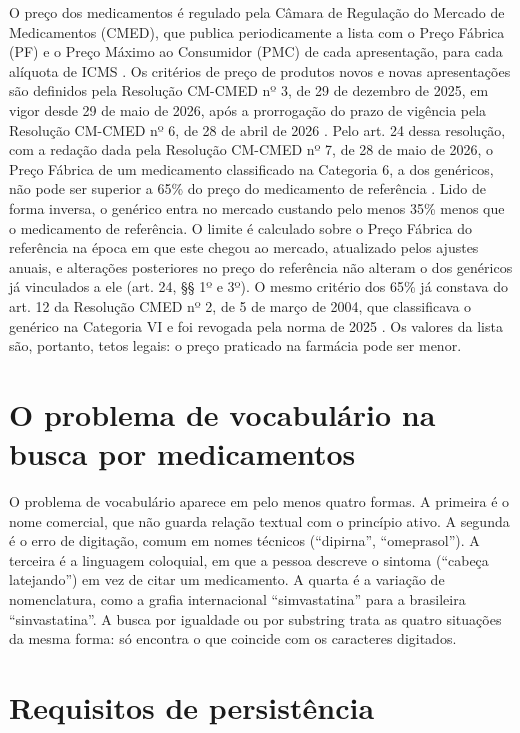 \documentclass[12pt,oneside,a4paper,english,brazil]{abntex2}
\begin{document}
O preço dos medicamentos é regulado pela Câmara de Regulação do Mercado de Medicamentos (CMED), que publica periodicamente a lista com o Preço Fábrica (PF) e o Preço Máximo ao Consumidor (PMC) de cada apresentação, para cada alíquota de ICMS \cite{cmed2026}. Os critérios de preço de produtos novos e novas apresentações são definidos pela Resolução CM-CMED nº 3, de 29 de dezembro de 2025, em vigor desde 29 de maio de 2026, após a prorrogação do prazo de vigência pela Resolução CM-CMED nº 6, de 28 de abril de 2026 \cite{cmedres2025,cmedres2026prazo}. Pelo art. 24 dessa resolução, com a redação dada pela Resolução CM-CMED nº 7, de 28 de maio de 2026, o Preço Fábrica de um medicamento classificado na Categoria 6, a dos genéricos, não pode ser superior a 65\% do preço do medicamento de referência \cite{cmedres2026}. Lido de forma inversa, o genérico entra no mercado custando pelo menos 35\% menos que o medicamento de referência. O limite é calculado sobre o Preço Fábrica do referência na época em que este chegou ao mercado, atualizado pelos ajustes anuais, e alterações posteriores no preço do referência não alteram o dos genéricos já vinculados a ele (art. 24, §§ 1º e 3º). O mesmo critério dos 65\% já constava do art. 12 da Resolução CMED nº 2, de 5 de março de 2004, que classificava o genérico na Categoria VI e foi revogada pela norma de 2025 \cite{cmedres2004}. Os valores da lista são, portanto, tetos legais: o preço praticado na farmácia pode ser menor.

\section{O problema de vocabulário na busca por medicamentos}

O problema de vocabulário aparece em pelo menos quatro formas. A primeira é o nome comercial, que não guarda relação textual com o princípio ativo. A segunda é o erro de digitação, comum em nomes técnicos (``dipirna'', ``omeprasol''). A terceira é a linguagem coloquial, em que a pessoa descreve o sintoma (``cabeça latejando'') em vez de citar um medicamento. A quarta é a variação de nomenclatura, como a grafia internacional ``simvastatina'' para a brasileira ``sinvastatina''. A busca por igualdade ou por substring trata as quatro situações da mesma forma: só encontra o que coincide com os caracteres digitados.

\section{Requisitos de persistência}
\end{document}
